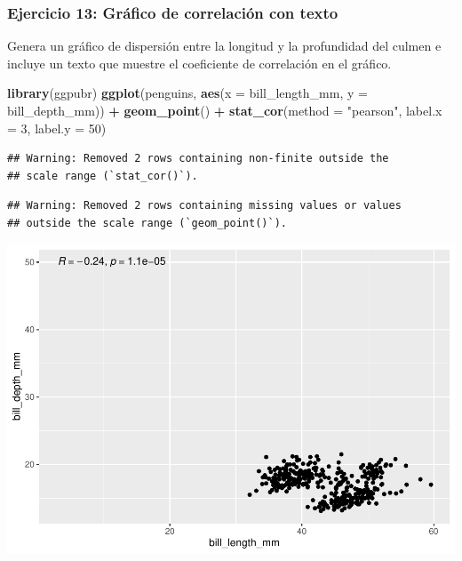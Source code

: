 \documentclass[
]{book}
\newenvironment{Shaded}{\begin{snugshade}}{\end{snugshade}}
\newcommand{\AttributeTok}[1]{\textcolor[rgb]{0.13,0.29,0.53}{#1}}
\newcommand{\DecValTok}[1]{\textcolor[rgb]{0.00,0.00,0.81}{#1}}
\newcommand{\FunctionTok}[1]{\textcolor[rgb]{0.13,0.29,0.53}{\textbf{#1}}}
\newcommand{\NormalTok}[1]{#1}
\newcommand{\SpecialCharTok}[1]{\textcolor[rgb]{0.81,0.36,0.00}{\textbf{#1}}}
\newcommand{\StringTok}[1]{\textcolor[rgb]{0.31,0.60,0.02}{#1}}
\begin{document}
\subsubsection{Ejercicio 13: Gráfico de correlación con texto}\label{ejercicio-13-gruxe1fico-de-correlaciuxf3n-con-texto}

Genera un gráfico de dispersión entre la longitud y la profundidad del culmen e incluye un texto que muestre el coeficiente de correlación en el gráfico.

\begin{Shaded}
\begin{Highlighting}[]
\FunctionTok{library}\NormalTok{(ggpubr)}
\FunctionTok{ggplot}\NormalTok{(penguins, }\FunctionTok{aes}\NormalTok{(}\AttributeTok{x =}\NormalTok{ bill\_length\_mm, }\AttributeTok{y =}\NormalTok{ bill\_depth\_mm)) }\SpecialCharTok{+}
  \FunctionTok{geom\_point}\NormalTok{() }\SpecialCharTok{+}
  \FunctionTok{stat\_cor}\NormalTok{(}\AttributeTok{method =} \StringTok{"pearson"}\NormalTok{, }\AttributeTok{label.x =} \DecValTok{3}\NormalTok{, }\AttributeTok{label.y =} \DecValTok{50}\NormalTok{)}
\end{Highlighting}
\end{Shaded}

\begin{verbatim}
## Warning: Removed 2 rows containing non-finite outside the
## scale range (`stat_cor()`).
\end{verbatim}

\begin{verbatim}
## Warning: Removed 2 rows containing missing values or values
## outside the scale range (`geom_point()`).
\end{verbatim}

\includegraphics{bookdown-demo_files/figure-latex/unnamed-chunk-195-1.pdf}
\end{document}
